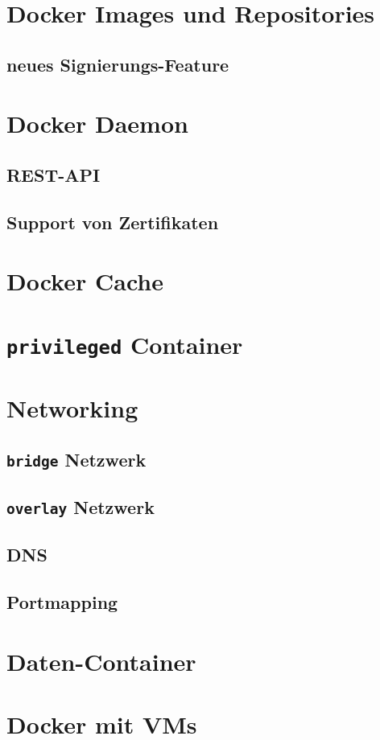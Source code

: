 \documentclass[11pt,a4paper,oneside]{report}
\begin{document}
  \section{Docker Images und Repositories}
		\subsection{neues Signierungs-Feature}
	\section{Docker Daemon}
		\subsection{REST-API}
		\subsection{Support von Zertifikaten}
	\section{Docker Cache}
	\section{\texttt{privileged} Container}
	\section{Networking}
		\subsection{\texttt{bridge} Netzwerk}
		\subsection{\texttt{overlay} Netzwerk}
		\subsection{DNS}
		\subsection{Portmapping}
	\section{Daten-Container}
	\section{Docker mit VMs}
\end{document}
